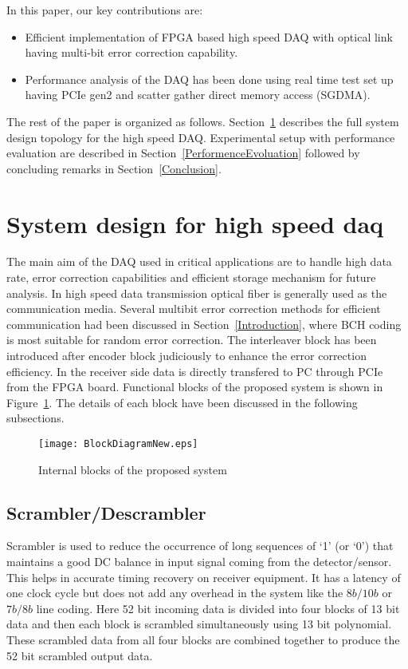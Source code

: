 \documentclass[10pt, conference, compsocconf]{IEEEtran}
\begin{document}
In this paper, our key contributions are:
\begin{itemize}
\item Efficient implementation of FPGA based high speed DAQ with optical link having multi-bit error correction capability.
\item Performance analysis of the DAQ has been done using real time test set up having PCIe gen2 and scatter gather direct memory access (SGDMA).
\end{itemize}   
The rest of the paper is organized as follows. Section~\ref{SystemDesignDAQ} describes the full system design topology for the high speed DAQ. Experimental setup with performance evaluation are described in Section~\ref{PerformenceEvoluation} followed by concluding remarks in Section~\ref{Conclusion}.

\section{System design for high speed daq}\label{SystemDesignDAQ}
The main aim of the DAQ used in critical applications are to handle high data rate, error correction capabilities and efficient storage mechanism for future analysis. In high speed data transmission optical fiber is generally used as the communication media. Several multibit error correction methods for efficient communication had been discussed in Section~\ref{Introduction}, where BCH coding is most suitable for random error correction. The interleaver block has been introduced after encoder block judiciously to enhance the error correction efficiency. In the receiver side data is directly transfered to PC through PCIe from the FPGA board. Functional blocks of the proposed system is shown in Figure~\ref{fig:BlockDiagramFlow}. The details of each block have been discussed in the following subsections. 
\begin{figure}[!htb]	
\hspace{-20 pt}
\vspace{-5pt}
\texttt{[image: BlockDiagramNew.eps]}
\caption{Internal blocks of the proposed system}
\vspace{-15pt}
\label{fig:BlockDiagramFlow}
\end{figure}
\subsection{Scrambler/Descrambler} Scrambler is used to reduce the occurrence of long sequences of `1' (or `0') that maintains a good DC balance in input signal coming from the detector/sensor. This helps in accurate timing recovery on receiver equipment. It has a latency of one clock cycle but does not add any overhead in the system like the $8b/10b$ or $7b/8b$ line coding. Here 52 bit incoming data is divided into four blocks of 13 bit data and then each block is scrambled simultaneously using 13 bit polynomial. These scrambled data from all four blocks are combined together to produce the 52 bit scrambled output data. 
\end{document}

